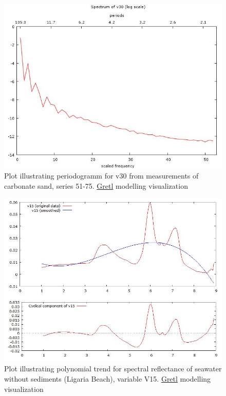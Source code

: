 \documentclass[10pt, a4paper]{article}
\begin{document}
\begin{appendices}
\begin{figure}[H]
	\begin{center}
		\includegraphics[scale=0.25]{G-period-sand30.jpg}
		\caption{Plot illustrating periodogramm for v30 from measurements of carbonate sand, series 51-75. \href{http://gretl.sourceforge.net/}{Gretl} modelling visualization­}\label{fig:A.31}
	\end{center}	
\end{figure}
\pagebreak

\begin{figure}[H]
	\begin{center}
		\includegraphics[scale=0.32]{G-polynom-trend-wo.jpg}
		\caption{Plot illustrating polynomial trend for spectral reflectance of seawater without sediments (Ligaria Beach), variable V15. \href{http://gretl.sourceforge.net/}{Gretl} modelling visualization­}
	\end{center}
	\label{fig:A.32}
\end{figure}


\end{appendices}
\end{document}
